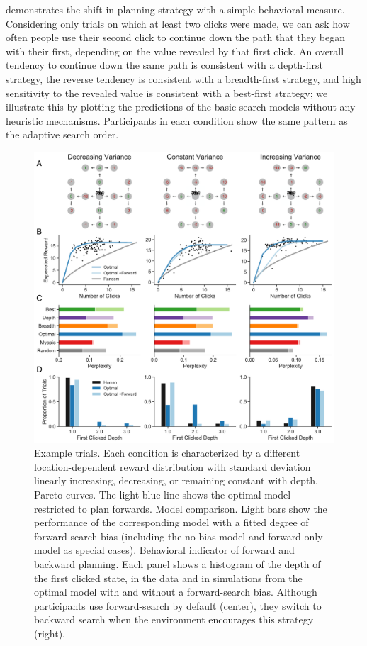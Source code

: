  demonstrates the shift in planning strategy with a simple behavioral measure. Considering only trials on which at least two clicks were made, we can ask how often people use their second click to continue down the path that they began with their first, depending on the value revealed by that first click. An overall tendency to continue down the same path is consistent with a depth-first strategy, the reverse tendency is consistent with a breadth-first strategy, and high sensitivity to the revealed value is consistent with a best-first strategy; we illustrate this by plotting the predictions of the basic search models without any heuristic mechanisms. Participants in each condition show the same pattern as the adaptive search order.

\begin{figure}[p]
  \centering
  \includegraphics[width=\textwidth]{figs/planning/fig5.pdf}
  \caption{
   Example trials. Each condition is characterized by a different location-dependent reward distribution with standard deviation linearly increasing, decreasing, or remaining constant with depth.
   Pareto curves. 
  The light blue line shows the optimal model restricted to plan forwards.
   Model comparison. Light bars show the performance of the corresponding model with a fitted degree of forward-search bias (including the no-bias model and forward-only model as special cases).
   Behavioral indicator of forward and backward planning. Each panel shows a histogram of the depth of the first clicked state, in the data and in simulations from the optimal model with and without a forward-search bias. Although participants use forward-search by default (center), they switch to backward search when the environment encourages this strategy (right).
  \vspace{1cm}
  }
  \label{fig:planning-exp3}
\end{figure}


